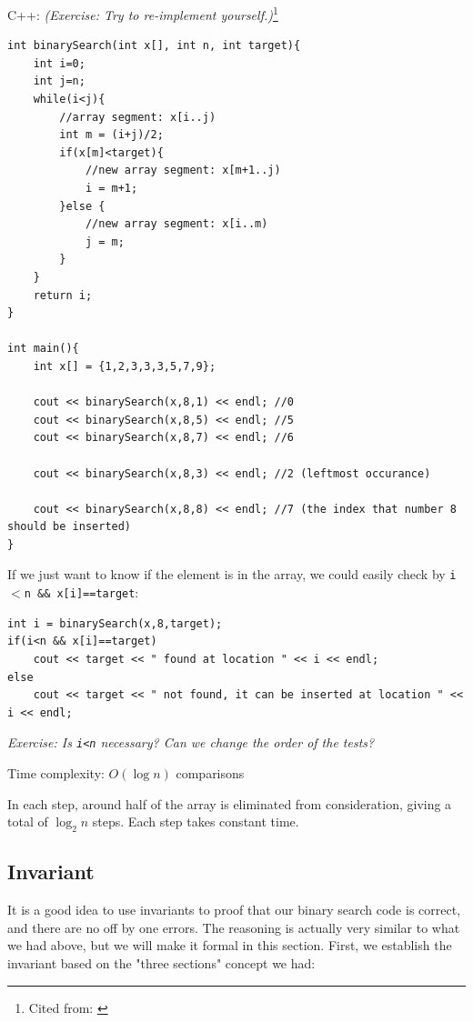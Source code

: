 \pagebreak

C++: \textit{(Exercise:  Try to re-implement yourself.)}\footnote{Cited from: \cite{ip:binsearch}}

\begin{lstlisting}
int binarySearch(int x[], int n, int target){
    int i=0;
    int j=n;
    while(i<j){
        //array segment: x[i..j)
        int m = (i+j)/2;
        if(x[m]<target){
            //new array segment: x[m+1..j)
            i = m+1;
        }else {
            //new array segment: x[i..m)
            j = m;
        }
    }
    return i;
}

int main(){
    int x[] = {1,2,3,3,3,5,7,9};

    cout << binarySearch(x,8,1) << endl; //0
    cout << binarySearch(x,8,5) << endl; //5
    cout << binarySearch(x,8,7) << endl; //6

    cout << binarySearch(x,8,3) << endl; //2 (leftmost occurance)

    cout << binarySearch(x,8,8) << endl; //7 (the index that number 8 should be inserted)
}
\end{lstlisting}

If we just want to know if the element is in the array, we could easily check by \texttt{i$<$n \&\& x[i]==target}:

\begin{lstlisting}
int i = binarySearch(x,8,target);
if(i<n && x[i]==target)
    cout << target << " found at location " << i << endl;
else 
    cout << target << " not found, it can be inserted at location " << i << endl;
\end{lstlisting}

\textit{Exercise: Is \texttt{i<n} necessary? Can we change the order of the tests?}


Time complexity: $O(\log n)$ comparisons


In each step, around half of the array is eliminated from consideration, giving a total of $\log_2 n$ steps. Each step takes constant time.

\if{}

\subsection*{Invariant}

It is a good idea to use invariants to proof that our binary search code is correct, and there are no off by one errors. The reasoning is actually very similar to what we had above, but we will make it formal in this section. First, we establish the invariant based on the "three sections" concept we had: 

